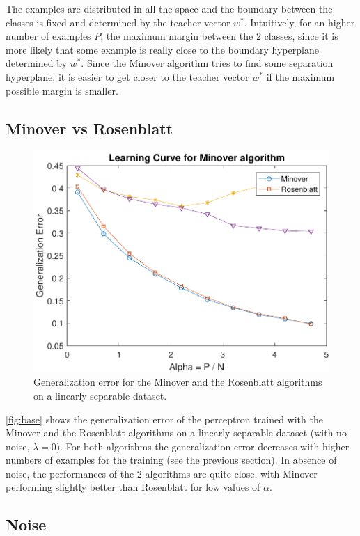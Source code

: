 The examples are distributed in all the space and the boundary between the classes is fixed and determined by the teacher vector $w^{*}$.
Intuitively, for an higher number of examples $P$, the maximum margin between the $2$ classes, since it is more likely that some example is really close to the boundary hyperplane determined by $w^{*}$.
Since the Minover algorithm tries to find some separation hyperplane, it is easier to get closer to the teacher vector $w^{*}$ if the maximum possible margin is smaller.


\subsection{Minover vs Rosenblatt}
\begin{figure}[t]
	\centering
	\includegraphics[width=\columnwidth]{figures/comparison}
    \caption{Generalization error for the Minover and the Rosenblatt algorithms on a linearly separable dataset.}
	\label{fig:comparison}
\end{figure}

\cref{fig:base} shows the generalization error of the perceptron trained with the Minover and the Rosenblatt algorithms on a linearly separable dataset (with no noise, $\lambda = 0$).
For both algorithms the generalization error decreases with higher numbers of examples for the training (see the previous section).
In absence of noise, the performances of the $2$ algorithms are quite close, with Minover performing slightly better than Rosenblatt for low values of $\alpha$.


\subsection{Noise}
